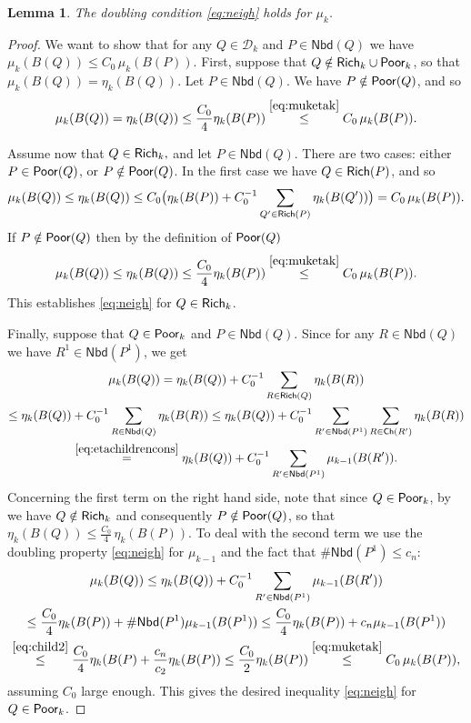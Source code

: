 \documentclass[11pt,reqno]{amsart}
\newcommand{\fr}[2]{\frac{#1}{#2}}
\newtheorem{lemma}[theorem]{Lemma}
\theoremstyle{definition}
\theoremstyle{remark}
\numberwithin{equation}{section}
\newcommand{\DD}{\mathcal{D}}
\newcommand{\Child}{\mathsf{Ch}}
\newcommand{\Nei}{\mathsf{Nbd}}
\theoremstyle{theorem}
\theoremstyle{definition}
\theoremstyle{remark}
\numberwithin{equation}{section}
\begin{document}
\begin{lemma}
	The doubling condition \eqref{eq:neigh} holds for $\mu_k$.
\end{lemma}
\begin{proof}
	We want to show that for any $Q\in\DD_k$ and $P\in\Nei(Q)$ we have $\mu_k(B(Q))\le C_0\,\mu_k(B(P))$. First, suppose that $Q\notin\mathsf{Rich}_k\cup\mathsf{Poor}_k$, so that $\mu_k(B(Q))=\eta_k(B(Q))$. Let $P\in\Nei(Q)$. We have $P\notin\mathsf{Poor}(Q)$, and so
	\begin{equation*}
	\mu_k(B(Q))=\eta_k(B(Q))\le\fr{C_0}{4}\eta_k(B(P))\overset{\eqref{eq:muketak}}{\le} C_0\,\mu_k(B(P)).
	\end{equation*}
	
	Assume now that $Q\in\mathsf{Rich}_k,$ and let $P\in\Nei(Q)$. There are two cases: either $P\in\mathsf{Poor}(Q)$, or $P\notin\mathsf{Poor}(Q)$. In the first case we have $Q\in\mathsf{Rich}(P)$, and so
	\begin{equation*}
	\mu_k(B(Q))\le \eta_{k}(B(Q))\le C_0\big(\eta_k(B(P)) + C_0^{-1}\sum_{Q'\in\mathsf{Rich}(P)}\eta_k(B(Q'))\big) = C_0\,\mu_k(B(P)).
	\end{equation*}
	If $P\notin\mathsf{Poor}(Q)$ then by the definition of $\mathsf{Poor}(Q)$
	\begin{equation*}
	\mu_k(B(Q))\le \eta_{k}(B(Q))\le \fr{C_0}{4}\eta_k(B(P))\overset{\eqref{eq:muketak}}{\le}C_0\, \mu_k(B(P)).
	\end{equation*}
	This establishes \eqref{eq:neigh} for $Q\in\mathsf{Rich}_k$.
	
	Finally, suppose that $Q\in\mathsf{Poor}_k$ and $P\in\Nei(Q)$. Since for any $R\in \Nei(Q)$ we have $R^1\in\Nei(P^1)$, we get
	\begin{multline*}
	\mu_k(B(Q)) = \eta_k(B(Q)) + C_0^{-1}\sum_{R\in\Rich(Q)}\eta_k(B(R))\\ 
	\le \eta_k(B(Q)) + C_0^{-1}\sum_{R\in\Nei(Q)}\eta_k(B(R))\le \eta_k(B(Q)) + C_0^{-1}\sum_{R'\in\Nei(P^1)}\sum_{R\in\Child(R')}\eta_k(B(R))\\
	\overset{\eqref{eq:etachildrencons}}{=} \eta_k(B(Q)) + C_0^{-1}\sum_{R'\in\Nei(P^1)}\mu_{k-1}(B(R')).
	\end{multline*}
	Concerning the first term on the right hand side, note that since $Q\in\mathsf{Poor}_k$, by  we have $Q\notin\mathsf{Rich}_k$ and consequently $P\notin\mathsf{Poor}(Q)$, so that $\eta_k(B(Q))\le \frac{C_0}{4}\,\eta_k(B(P))$. To deal with the second term we use the doubling property \eqref{eq:neigh} for $\mu_{k-1}$ and the fact that $\#\Nei(P^1)\le c_n$:
	\begin{multline*}
	\mu_k(B(Q))\le \eta_k(B(Q)) + C_0^{-1}\sum_{R'\in\Nei(P^1)}\mu_{k-1}(B(R'))\\ \le \fr{C_0}{4}\eta_k(B(P)) + \#\Nei(P^1)\mu_{k-1}(B(P^1))
	\le \fr{C_0}{4}\eta_k(B(P)) + c_n \mu_{k-1}(B(P^1)) \\
	\overset{\eqref{eq:child2}}{\le} \fr{C_0}{4}\eta_k(B(P) + \fr{c_n}{c_2}\eta_{k}(B(P))\le \fr{C_0}{2}\eta_{k}(B(P))\overset{\eqref{eq:muketak}}{\le} C_0\,\mu_k(B(P)),
	\end{multline*}
	assuming $C_0$ large enough. This gives the desired inequality \eqref{eq:neigh} for $Q\in\mathsf{Poor}_k$.	
\end{proof}
\end{document}
